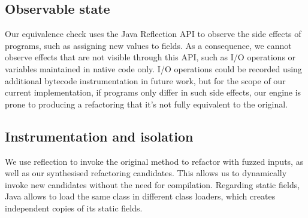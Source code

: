 \documentclass[sigconf]{acmart}
\begin{document}
%


\subsection{Observable state}\label{sec:observable}

Our equivalence check uses the Java Reflection API to observe the side effects
of programs, such as assigning new values to fields. As a consequence, we cannot
observe effects that are not visible through this API, such as I/O operations or
variables maintained in native code only. I/O operations could be recorded using
additional bytecode instrumentation in future work, but for the scope of our current
implementation, if programs only differ in such %
side effects, our engine is prone to producing a refactoring that it's not fully equivalent to the original.




\subsection{Instrumentation and isolation}

We use reflection to invoke the original method to refactor with fuzzed inputs,
as well as our synthesised refactoring candidates. This allows us to dynamically
invoke new candidates without the need for compilation.
Regarding static fields, Java
allows to load the same class in different class loaders, which creates
independent copies of its static fields.
\end{document}
